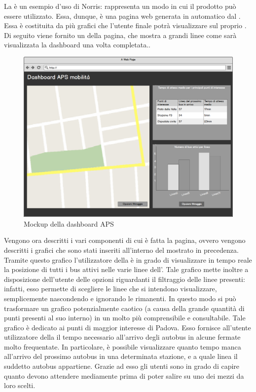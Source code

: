 	La  è un esempio d'uso di Norris: rappresenta un modo in cui il prodotto può essere utilizzato. Essa, dunque, è una pagina web generata in automatico dal  . Essa è costituita da più grafici che l'utente finale potrà visualizzare sul proprio . Di seguito viene fornito un  della pagina, che mostra a grandi linee come sarà visualizzata la dashboard una volta completata..
	\begin{figure}[H]\centering
        \includegraphics[width=\textwidth]{SpecificaTecnica/Pics/DashboardMockup}
        \caption{Mockup della dashboard APS}
    \end{figure}
    Vengono ora descritti i vari componenti di cui è fatta la pagina, ovvero vengono descritti i grafici che sono stati inseriti all'interno del  mostrato in precedenza.
    		Tramite questo grafico l'utilizzatore della  è in grado di visualizzare in tempo reale la posizione di tutti i bus attivi nelle varie linee dell'. Tale grafico mette inoltre a disposizione dell'utente delle opzioni riguardanti il filtraggio delle linee presenti: infatti, esso permette di scegliere le linee che si intendono visualizzare, semplicemente nascondendo e ignorando le rimanenti. In questo modo si può trasformare un grafico potenzialmente caotico (a causa della grande quantità di punti presenti al suo interno) in un molto più comprensibile e consultabile.
    		Tale grafico è dedicato ai punti di maggior interesse di Padova. Esso fornisce all'utente utilizzatore della  il tempo necessario all'arrivo degli autobus in alcune fermate  molto frequentate. In particolare, è possibile visualizzare quanto tempo manca all'arrivo del prossimo autobus in una determinata stazione, e a quale linea il suddetto autobus appartiene. Grazie ad esso gli utenti sono in grado di capire quanto devono attendere mediamente prima di poter salire su uno dei mezzi da loro scelti.
